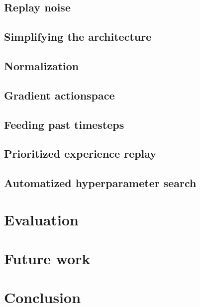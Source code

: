 \documentclass[hyperref,german,beleg]{cgvpub}
\begin{document}
\section{Replay noise}

\section{Simplifying the architecture}

\section{Normalization}

\section{Gradient actionspace}

\section{Feeding past timesteps}

\section{Prioritized experience replay}

\section{Automatized hyperparameter search}

\chapter{Evaluation}


\chapter{Future work}


\chapter{Conclusion}

\end{document}
